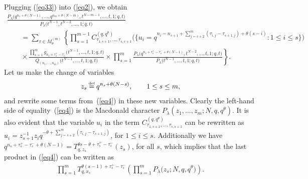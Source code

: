 \documentclass[pdftex]{sigma}
\numberwithin{equation}{section}
\newcommand\myeq{\mathrel{\stackrel{\makebox[0pt]{\mbox{\normalfont\tiny def}}}{=}}}
\begin{document}
Plugging (\ref{eq33}) into (\ref{eq2}), we obtain
\begin{gather}
\frac{P_{\lambda}\big(q^{n_1 + \theta(N-1)}, \dots, q^{n_m + \theta(N-m)}, t^{N-m-1}, \dots, t, 1; q, t\big)}{P_{\lambda}\big(t^{N-1}, t^{N-2}, \dots, 1; q, t\big)}\label{eq4}\\
\qquad {} =
\sum_{\tau\in M^{(m)}_{\theta}}\left\{\prod_{s=1}^{m-1}{C^{(q, q^{\theta})}_{\tau_{1, s+1}, \dots, \tau_{s, s+1}}\Big(\Big\{ u_i = q^{n_i - n_{s+1} + \sum\limits_{j=s+2}^m{(\tau_{i, j} - \tau_{s+1, j})} + \theta(s-i)}\colon 1\leq i\leq s\Big\}\Big) } \right.\nonumber\\
\left. \qquad{} \times\!\frac{\prod\limits_{s=1}^m{g_{n_s + \tau_s^+ - \tau_s^-}\big(t^{N-1}, \dots, t, 1; q, t\big)}}{Q_{(n_1, \dots, n_m)}\big(t^{N-1}, \dots, t, 1; q, t\big)}\!\times \!\prod_{s=1}^m\! { \frac{P_{\lambda}\big(q^{n_s + \tau_s^+ - \tau_s^- + \theta(N-1)}, t^{N-2}, \dots, t, 1; q, t\big)}{P_{\lambda}\big(t^{N-1}, \dots, t, 1; q, t\big)} } \right\}\!.\!\nonumber
\end{gather}
Let us make the change of variables
\begin{gather}\label{changevars}
z_s \myeq q^{n_s + \theta(N - s)}, \qquad 1\leq s\leq m,
\end{gather}
and rewrite some terms from~(\ref{eq4}) in these new variables. Clearly the left-hand side of equality~(\ref{eq4}) is the Macdonald character $P_{\lambda}(z_1, \dots, z_m; N, q, q^{\theta})$. It is also evident that the variable $u_i$ in the term $C_{\tau_{1, s+1}, \dots, \tau_{s, s+1}}^{(q, q^{\theta})}$ can be rewritten as $u_i = z_{s+1}^{-1}z_i q^{-\theta + \sum\limits_{j=s+2}^m{(\tau_{i, j} - \tau_{s+1, j})}}$, for $1\leq i\leq s$. Additionally we have $q^{n_s + \tau_s^+ - \tau_s^- + \theta(N-1)} = T_{q, z_s}^{\theta s - \theta + \tau_s^+ - \tau_s^-}( z_s )$, for all $s$, which implies that the last product in (\ref{eq4}) can be written as
\begin{gather*}
\prod\limits_{s=1}^m{T_{q, x_s}^{\theta(s-1) + \tau_s^+ - \tau_s^-}}\left( \prod_{s=1}^m{P_{\lambda}\big(z_s; N, q, q^{\theta}\big)} \right).
\end{gather*}
\end{document}
